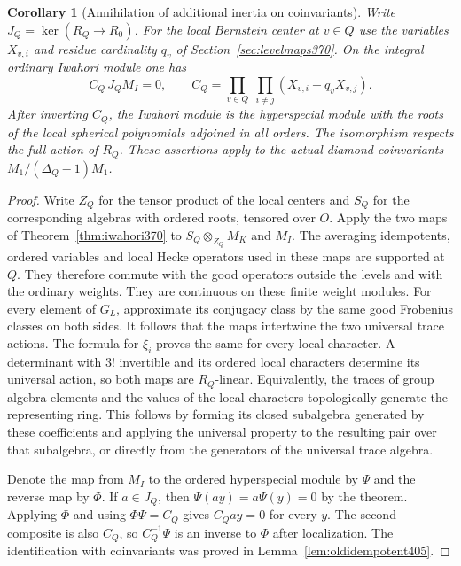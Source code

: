 \documentclass[a4paper,11pt]{article}
\newtheorem{corollary}[proposition]{Corollary}
\theoremstyle{definition}
\theoremstyle{remark}
\numberwithin{equation}{section}
\begin{document}
\begin{corollary}[Annihilation of additional inertia on coinvariants]\leavevmode
\label{cor:annram405}
Write \(J_Q=\ker(R_Q\to R_0)\). For the local Bernstein
center at \(v\in Q\) use the variables \(X_{v,i}\) and
residue cardinality \(q_v\) of Section~\ref{sec:levelmaps370}.
On the integral ordinary Iwahori module one has
\[
       C_Q\,J_Q M_I=0,\qquad
       C_Q=\prod_{v\in Q}\;\prod_{i\ne j}
                         (X_{v,i}-q_vX_{v,j}).
\]
After inverting \(C_Q\), the Iwahori module is the
hyperspecial module with the roots of the local spherical
polynomials adjoined in all orders. The isomorphism respects
the full action of \(R_Q\). These assertions apply to the
actual diamond coinvariants \(M_1/(\Delta_Q-1)M_1\).
\end{corollary}
\begin{proof}
Write \(Z_Q\) for the tensor product of the local centers
and \(S_Q\) for the corresponding algebras with ordered
roots, tensored over \(O\). Apply the two maps of
Theorem~\ref{thm:iwahori370} to \(S_Q\otimes_{Z_Q}M_K\)
and \(M_I\). The averaging idempotents, ordered variables
and local Hecke operators used in these maps are supported
at \(Q\). They therefore commute with the good operators
outside the levels and with the ordinary weights. They
are continuous on these finite weight modules. For every
element of \(G_L\), approximate its conjugacy class by
the same good Frobenius classes on both sides. It follows
that the maps intertwine the two universal trace actions.
The formula for \(\xi_i\) proves the same for every local
character. A determinant with \(3!\) invertible and its
ordered local characters determine its universal action,
so both maps are \(R_Q\)-linear. Equivalently, the traces
of group algebra elements and the values of the local
characters topologically generate the representing ring.
This follows by forming its closed subalgebra generated by
these coefficients and applying the universal property to
the resulting pair over that subalgebra, or directly from
the generators of the universal trace algebra.

Denote the map from \(M_I\) to the ordered hyperspecial
module by \(\Psi\) and the reverse map by \(\Phi\).
If \(a\in J_Q\), then \(\Psi(ay)=a\Psi(y)=0\) by the theorem.
Applying \(\Phi\) and using \(\Phi\Psi=C_Q\) gives
\(C_Qay=0\) for every \(y\). The second composite is also
\(C_Q\), so \(C_Q^{-1}\Psi\) is an inverse to \(\Phi\)
after localization. The identification with coinvariants
was proved in Lemma~\ref{lem:oldidempotent405}.
\end{proof}
\end{document}
